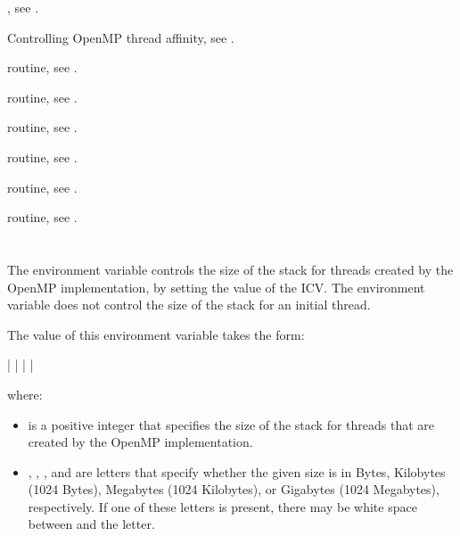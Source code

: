\begin{crossrefs}
\item {}, see .

\item Controlling OpenMP thread affinity, 
see .

\item {} routine, see .

\item {} routine, 
see .

\item {} routine, 
see .

\item {} routine, see .

\item {} routine, 
see .

\item {} routine, 
see .
\end{crossrefs}



\section{}
\label{sec:OMP_STACKSIZE}
The  environment variable controls the size of the 
stack for threads created by the OpenMP implementation, by setting the 
value of the  ICV. The environment variable does not 
control the size of the stack for an initial thread.

The value of this environment variable takes the form:

 |  |  |  | 

where:

\begin{itemize}
\item {} is a positive integer that specifies the size of the 
      stack for threads that are created by the OpenMP implementation.
\item {}, , , and  are letters that specify
      whether the given size is in Bytes, Kilobytes (1024 Bytes), Megabytes 
      (1024 Kilobytes), or Gigabytes (1024 Megabytes), respectively. If 
      one of these letters is present, there may be white space between
       and the letter.
\end{itemize}


